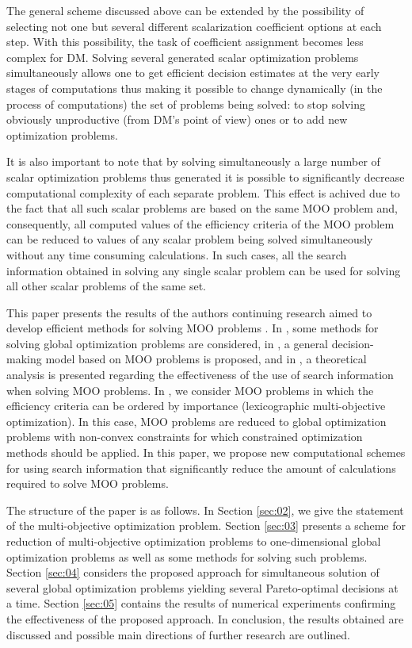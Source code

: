 \documentclass[runningheads]{llncs}
\begin{document}
The general scheme discussed above can be extended by the possibility of selecting not one but several different scalarization coefficient options at each step. With this possibility, the task of coefficient assignment becomes less complex for DM. Solving several generated scalar optimization problems simultaneously allows one to get efficient decision estimates at the very early stages of computations thus making it possible to change dynamically (in the process of computations) the set of problems being solved: to stop solving obviously unproductive (from DM's point of view) ones or to add new optimization problems.

It is also important to note that by solving simultaneously a large number of scalar optimization problems thus generated it is possible to significantly decrease computational complexity of each separate problem. This effect is achived due to the fact that all such scalar problems  are based on the same MOO problem and, consequently, all computed values of the efficiency criteria of the MOO problem can be reduced to values of any scalar problem being solved simultaneously without any time consuming calculations. In such cases, all the search information obtained in solving any single scalar problem can be used for solving all other scalar problems of the same set. 

This paper presents the results of the authors continuing research aimed to develop efficient methods for solving MOO problems \cite{c35,c36,c37,c44}. In \cite{c35}, some methods for solving global optimization problems are considered, in \cite{c36},  a general decision-making model based on MOO problems is proposed, and in \cite{c37}, a theoretical analysis is presented regarding the effectiveness of the use of search information when solving MOO problems. In \cite{c44}, we consider MOO problems in which the efficiency criteria can be ordered by importance (lexicographic multi-objective optimization). In this case, MOO problems are reduced to global optimization problems with non-convex constraints for which constrained optimization methods should be applied. In this paper, we propose new computational schemes for using search information that significantly reduce the amount of calculations required to solve MOO problems.

The structure of the paper is as follows. In Section \ref{sec:02}, we give the statement of the multi-objective optimization problem. Section \ref{sec:03} presents a scheme for reduction of multi-objective optimization problems to one-dimensional global optimization problems as well as some methods for solving such problems. Section \ref{sec:04} considers the proposed approach for simultaneous solution of several global optimization problems yielding several Pareto-optimal decisions at a time. Section \ref{sec:05} contains the results of numerical experiments confirming the effectiveness of the proposed approach. In conclusion, the results obtained are discussed and possible main directions of further research are outlined.
\end{document}
